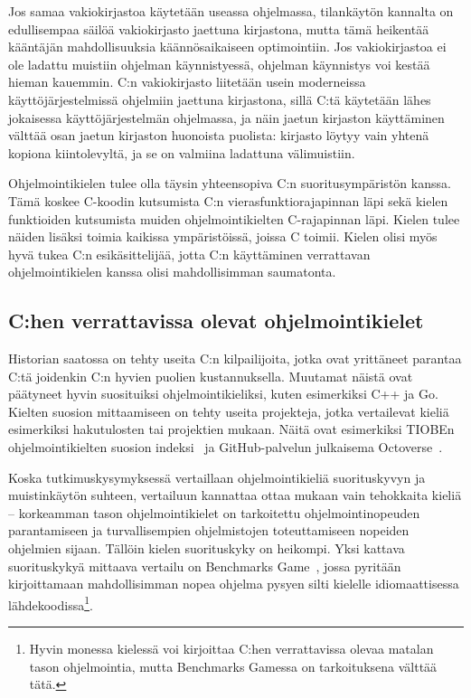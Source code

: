 Jos samaa vakiokirjastoa käytetään useassa ohjelmassa, tilankäytön kannalta on
edullisempaa säilöä vakiokirjasto jaettuna kirjastona, mutta tämä heikentää
kääntäjän mahdollisuuksia käännösaikaiseen optimointiin. Jos vakiokirjastoa ei
ole ladattu muistiin ohjelman käynnistyessä, ohjelman käynnistys voi kestää
hieman kauemmin. C:n vakiokirjasto liitetään usein moderneissa
käyttöjärjestelmissä ohjelmiin jaettuna kirjastona, sillä C:tä käytetään lähes
jokaisessa käyttöjärjestelmän ohjelmassa, ja näin jaetun kirjaston käyttäminen
välttää osan jaetun kirjaston huonoista puolista: kirjasto löytyy vain yhtenä
kopiona kiintolevyltä, ja se on valmiina ladattuna välimuistiin.

Ohjelmointikielen tulee olla täysin yhteensopiva C:n suoritusympäristön kanssa.
Tämä koskee C-koodin kutsumista C:n vierasfunktiorajapinnan
läpi sekä kielen funktioiden kutsumista
muiden ohjelmointikielten C-rajapinnan läpi. Kielen tulee näiden lisäksi toimia
kaikissa ympäristöissä, joissa C toimii. Kielen olisi myös hyvä tukea C:n
esikäsittelijää, jotta C:n käyttäminen verrattavan ohjelmointikielen kanssa
olisi mahdollisimman saumatonta.

\subsection{C:hen verrattavissa olevat ohjelmointikielet}


Historian saatossa on tehty useita C:n kilpailijoita, jotka ovat yrittäneet
parantaa C:tä joidenkin C:n hyvien puolien kustannuksella. Muutamat näistä ovat
päätyneet hyvin suosituiksi ohjelmointikieliksi, kuten esimerkiksi C++ ja Go.
Kielten suosion mittaamiseen on tehty useita projekteja, jotka vertailevat
kieliä esimerkiksi hakutulosten tai projektien mukaan. Näitä ovat esimerkiksi
TIOBEn ohjelmointikielten suosion indeksi~\citep{tiobe} ja GitHub-palvelun
julkaisema \mbox{Octoverse}~\citep{octoverse}.

Koska tutkimuskysymyksessä vertaillaan ohjelmointikieliä suorituskyvyn ja
muistinkäytön suhteen, vertailuun kannattaa ottaa mukaan vain tehokkaita kieliä
-- korkeamman tason ohjelmointikielet on tarkoitettu ohjelmointinopeuden
parantamiseen ja turvallisempien ohjelmistojen toteuttamiseen nopeiden
ohjelmien sijaan. Tällöin kielen suorituskyky on heikompi. Yksi kattava
suorituskykyä mittaava vertailu on Benchmarks Game~\citep{benchmarks}, jossa
pyritään kirjoittamaan mahdollisimman nopea ohjelma pysyen silti kielelle
idiomaattisessa lähdekoodissa\footnote{Hyvin monessa kielessä voi kirjoittaa
C:hen verrattavissa olevaa matalan tason ohjelmointia, mutta Benchmarks Gamessa
on tarkoituksena välttää tätä.}.

